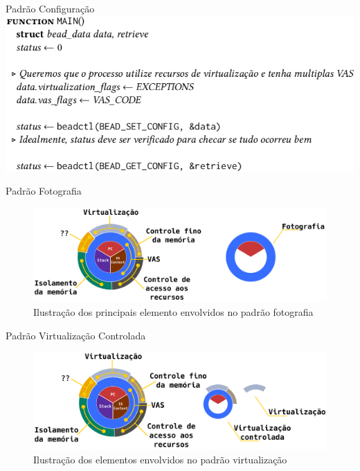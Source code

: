 \documentclass[xcolor={usenames,svgnames,dvipsnames},brazil,english,12pt,aspectratio=149]{beamer}
\begin{document}
\begin{frame}{Padrão Configuração}
  \centering
  \includegraphics[width=\textwidth]{padraoConfig}
\end{frame}

\begin{frame}{Padrão Fotografia}
  \begin{figure}[!h]
    \centering
    \includegraphics[width=\textwidth]{decomposition_fotografia}
    \caption*{Ilustração dos principais elemento envolvidos no padrão fotografia}
  \end{figure}
\end{frame}

\begin{frame}{Padrão Virtualização Controlada}
  \begin{figure}[!h]
    \centering
    \includegraphics[width=.8\textwidth]{decomposicao_virt_controlada}
    \caption*{Ilustração dos elementos envolvidos no padrão virtualização}
  \end{figure}
\end{frame}
\end{document}
